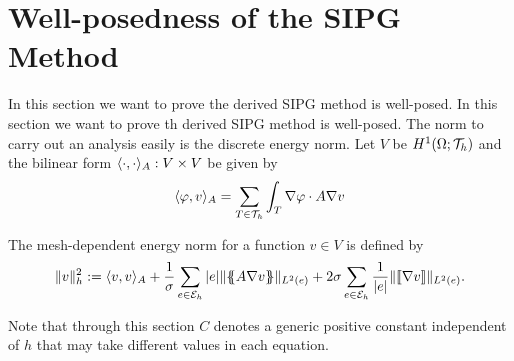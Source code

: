 \section{Well-posedness of the SIPG Method}

In this section we want to prove the derived SIPG method is well-posed.
In this section we want to prove th derived SIPG method is well-posed. The norm to carry out an analysis easily is the discrete energy norm.
Let $V$ be $H^1(\Omega; \mathcal{T}_h)$ and the bilinear form $ \langle \cdot, \cdot \rangle_A:V \times V$ be given by
\begin{align}
	 \langle \varphi, v \rangle _ A =  \sum_{T \in \mathcal{T}_h} \int_T \nabla \varphi \cdot A \nabla v
\end{align}
\begin{definition} \label{def: energy norm}
		The mesh-dependent energy norm for a function $v \in V$ is defined by
		\[
			\lVert v \rVert_{h} ^2 :=   \langle v, v \rangle _A + \frac 1 \sigma \sum_{e \in \mathcal{E}_h} |e|\lVert \{\!\!\{ A \nabla v \}\!\!\} \rVert_{L^2(e)} + 2  \sigma \sum_{e \in \mathcal{E}_h} \frac 1 {|e|}\lVert \llbracket \nabla v \rrbracket \rVert_{L^2(e)}.
		\]
\end{definition}

Note that through this section $C$ denotes a generic positive constant independent of $h$ that may take different values in each equation.

